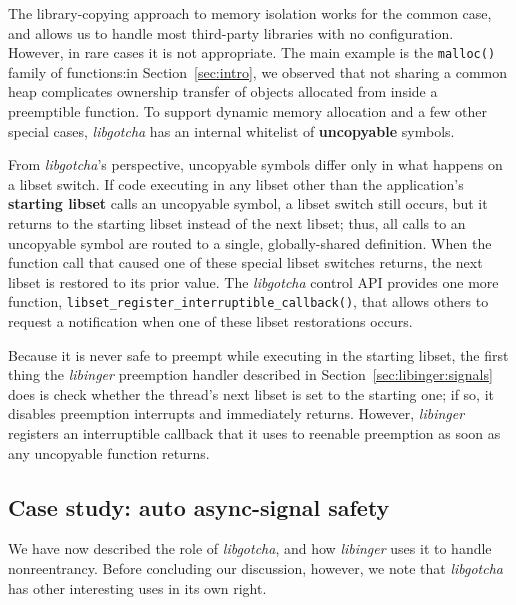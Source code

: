 The library-copying approach to memory isolation works for the common case, and
allows us to handle most third-party libraries with no configuration.  However, in
rare cases it is not appropriate.  The main example is the \texttt{malloc()} family
of functions:\@ in Section~\ref{sec:intro}, we observed that not sharing a common
heap complicates ownership transfer of objects allocated from inside a preemptible
function.  To support dynamic memory allocation and a few other special cases,
\textit{libgotcha} has an internal whitelist of \textbf{uncopyable} symbols.

From \textit{libgotcha}'s perspective, uncopyable symbols differ only in what
happens on a libset switch.  If code executing in any libset other than the
application's \textbf{starting libset} calls an uncopyable symbol, a libset
switch still occurs, but it returns to the starting libset instead of the next
libset; thus, all calls to an uncopyable symbol are routed to a single,
globally-shared definition.  When the function call that caused one of these special
libset switches returns, the next libset is restored to its prior value.  The
\textit{libgotcha} control API provides one more function,
\texttt{libset\_register\_interruptible\_callback()}, that allows others to request
a notification when one of these libset restorations occurs.

Because it is never safe to preempt while executing in the starting libset, the
first thing the \textit{libinger} preemption handler described in
Section~\ref{sec:libinger:signals} does is check whether the thread's next libset
is set to the starting one; if so, it disables preemption interrupts and immediately
returns.  However, \textit{libinger} registers an interruptible callback that it uses
to reenable preemption as soon as any uncopyable function returns.



\subsection{Case study: auto async-signal safety}
\label{sec:assafe}

We have now described the role of \textit{libgotcha}, and how \textit{libinger} uses
it to handle nonreentrancy.  Before concluding our discussion, however, we note that
\textit{libgotcha} has other interesting uses in its own right.

